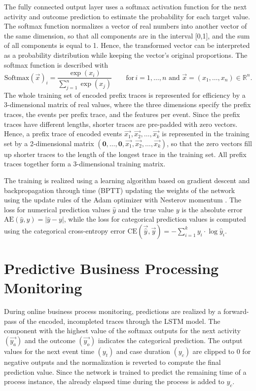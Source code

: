 The fully connected output layer uses a softmax activation function for the next activity and outcome prediction to estimate the probability for each target value.
The softmax function normalizes a vector of real numbers into another vector of the same dimension, so that all components are in the interval [0,1], and the sum of all components is equal to 1.
Hence, the transformed vector can be interpreted as a probability distribution while keeping the vector’s original proportions.
The softmax function is described with
\begin{equation*}\label{key}
	\text{Softmax}(\vec{x})_i = \frac{\exp(x_i)}{\sum_{j=1}^{n} \exp(x_j)}  \qquad \text{for} \, i = 1, \dots, n \text{ and } \vec{x}=(x_1, \dots, x_n) \in \mathbb{R}^n.
\end{equation*}
The whole training set of encoded prefix traces is represented for efficiency by a 3-dimensional matrix of real values, where the three dimensions specify the prefix traces, the events per prefix trace, and the features per event.
Since the prefix traces have different lengths, shorter traces are pre-padded \cite{DBLP:journals/corr/abs-1903-07288} with zero vectors.
Hence, a prefix trace of encoded events $\vec{x_1}, \vec{x_2}, \dots, \vec{x_k}$  is represented in the training set by a 2-dimensional matrix $(\mathbf{0}, \dots, \mathbf{0},\vec{x_1}, \vec{x_2}, \dots, \vec{x_k})$, so that the zero vectors fill up shorter traces to the length of the longest trace in the training set.
All prefix traces together form a 3-dimensional training matrix.

The training is realized using a learning algorithm based on gradient descent and backpropagation through time (BPTT) \cite{DBLP:journals/compsys/Mozer89} updating the weights of the network using the update rules of the Adam optimizer with Nesterov momentum \cite{dozat2016incorporating}.
The loss for numerical prediction values $\hat{y}$ and the true value $y$ is the absolute error $\text{AE}(\hat{y},y)=|\hat{y} - y|$, while the loss for categorical prediction values is computed using the categorical cross-entropy error $\text{CE}(\vec{\hat{y}}, \vec{y}) = - \sum_{i=1}^{k} y_i \cdot \log \hat{y}_i$.

\section{Predictive Business Processing Monitoring}

During online business process monitoring, predictions are realized by a forward-pass of the encoded, incompleted traces through the LSTM model.
The component with the highest value of the softmax outputs for the next activity $(\vec{y_a})$ and the outcome $(\vec{y_o})$ indicates the categorical prediction.
The output values for the next event time $(y_t)$ and case duration $(y_c)$ are clipped to 0 for negative outputs and the normalization is reverted to compute the final prediction value.
Since the network is trained to predict the remaining time of a process instance, the already elapsed time during the process is added to $y_c$. 

